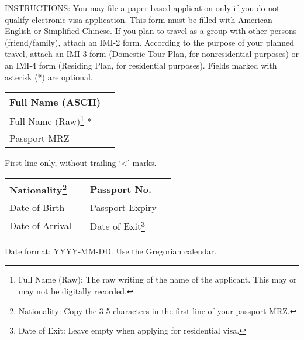 




\begin{minipage}{\textwidth}
	\small
	INSTRUCTIONS:
	\inlinelistitem You may file a paper-based application only if you do not qualify electronic visa application.
	\inlinelistitem This form must be filled with American English or Simplified Chinese.
	\inlinelistitem If you plan to travel as a group with other persons (friend/family), attach an IMI-2 form.
	\inlinelistitem According to the purpose of your planned travel, attach an IMI-3 form (Domestic Tour Plan, for nonresidential purposes) or an IMI-4 form (Residing Plan, for residential purposes).
	\inlinelistitem Fields marked with asterisk (*) are optional.
\end{minipage}



\begin{tabu}{|l|X|}
	\hline
	{\formfieldlead Full Name (ASCII)}                                                                                                                     & {} \\
	\hline
	{\formfieldlead Full Name (Raw)\footnote{Full Name (Raw): The raw writing of the name of the applicant. This may or may not be digitally recorded.} *} & {} \\
	\hline
	{\formfieldlead Passport MRZ}                                                                                                                          & {} \\
	\hline
\end{tabu}
{\small First line only, without trailing `<' marks.}

\begin{tabu}{|l|X|l|X|}
	\hline
	{\formfieldlead Nationality\footnote{Nationality: Copy the 3-5 characters in the first line of your passport MRZ.}} & {} & {\formfieldlead Passport No.}                                                                         & {} \\
	\hline
	{\formfieldlead Date of Birth}                                                                                      & {} & {\formfieldlead Passport Expiry}                                                                      & {} \\
	\hline
	{\formfieldlead Date of Arrival}                                                                                    & {} & {\formfieldlead Date of Exit\footnote{Date of Exit: Leave empty when applying for residential visa.}} & {} \\
	\hline
\end{tabu}
{\small Date format: YYYY-MM-DD. Use the Gregorian calendar.}

